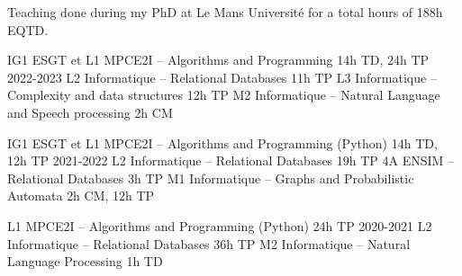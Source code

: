 
Teaching done during my PhD at Le Mans Université for a total hours of 188h EQTD.

\begin{cvhonors}
\cvhonor
    {IG1 ESGT et L1 MPCE2I}
    {-- Algorithms and Programming}
    {14h TD, 24h TP}
    {2022-2023}
\cvhonor
    {L2 Informatique}
    {-- Relational Databases}
    {11h TP}
    {}
\cvhonor
    {L3 Informatique}
    {-- Complexity and data structures}
    {12h TP}
    {}
\cvhonor
    {M2 Informatique}
    {-- Natural Language and Speech processing}
    {2h CM}
    {}

\cvhonor
    {IG1 ESGT et L1 MPCE2I}
    {-- Algorithms and Programming (Python)}
    {14h TD, 12h TP}
    {2021-2022}
\cvhonor
    {L2 Informatique}
    {-- Relational Databases}
    {19h TP}
    {}
\cvhonor
    {4A ENSIM}
    {-- Relational Databases}
    {3h TP}
    {}
\cvhonor
    {M1 Informatique}
    {-- Graphs and Probabilistic Automata}
    {2h CM, 12h TP}
    {}

\cvhonor
    {L1 MPCE2I}
    {-- Algorithms and Programming (Python)}
    {24h TP}
    {2020-2021}
\cvhonor
    {L2 Informatique}
    {-- Relational Databases}
    {36h TP}
    {}
\cvhonor
    {M2 Informatique}
    {-- Natural Language Processing}
    {1h TD}
    {}
\end{cvhonors}

